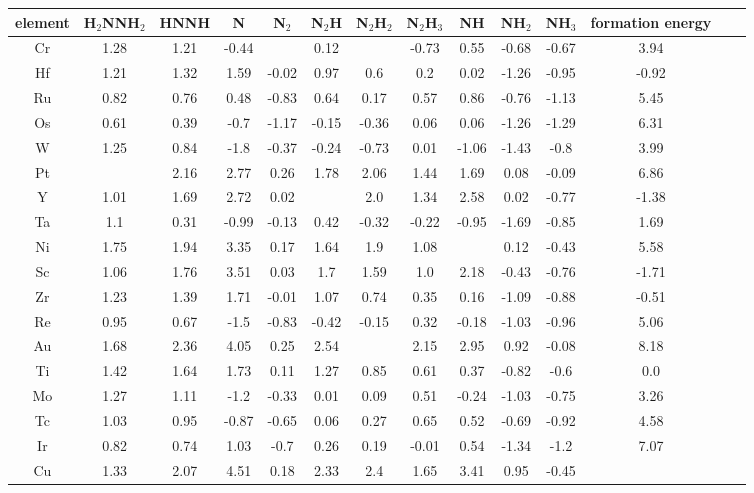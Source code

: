 \begin{center}
\begin{tabular}{| c | c | c | c | c | c | c | c | c | c | c | c | c | c |}
\hline
element & H$_2$NNH$_2$ & HNNH & N & N$_2$ & N$_2$H & N$_2$H$_2$ & N$_2$H$_3$ & NH & NH$_2$ & NH$_3$ & formation energy\\
\hline

Cr & 1.28 & 1.21 & -0.44 &  & 0.12 &  & -0.73 & 0.55 & -0.68 & -0.67 & 3.94 \\
Hf & 1.21 & 1.32 & 1.59 & -0.02 & 0.97 & 0.6 & 0.2 & 0.02 & -1.26 & -0.95 & -0.92 \\
Ru & 0.82 & 0.76 & 0.48 & -0.83 & 0.64 & 0.17 & 0.57 & 0.86 & -0.76 & -1.13 & 5.45 \\
Os & 0.61 & 0.39 & -0.7 & -1.17 & -0.15 & -0.36 & 0.06 & 0.06 & -1.26 & -1.29 & 6.31 \\
W & 1.25 & 0.84 & -1.8 & -0.37 & -0.24 & -0.73 & 0.01 & -1.06 & -1.43 & -0.8 & 3.99 \\
Pt &  & 2.16 & 2.77 & 0.26 & 1.78 & 2.06 & 1.44 & 1.69 & 0.08 & -0.09 & 6.86 \\
Y & 1.01 & 1.69 & 2.72 & 0.02 &  & 2.0 & 1.34 & 2.58 & 0.02 & -0.77 & -1.38 \\
Ta & 1.1 & 0.31 & -0.99 & -0.13 & 0.42 & -0.32 & -0.22 & -0.95 & -1.69 & -0.85 & 1.69 \\
Ni & 1.75 & 1.94 & 3.35 & 0.17 & 1.64 & 1.9 & 1.08 &  & 0.12 & -0.43 & 5.58 \\
Sc & 1.06 & 1.76 & 3.51 & 0.03 & 1.7 & 1.59 & 1.0 & 2.18 & -0.43 & -0.76 & -1.71 \\
Zr & 1.23 & 1.39 & 1.71 & -0.01 & 1.07 & 0.74 & 0.35 & 0.16 & -1.09 & -0.88 & -0.51 \\
Re & 0.95 & 0.67 & -1.5 & -0.83 & -0.42 & -0.15 & 0.32 & -0.18 & -1.03 & -0.96 & 5.06 \\
Au & 1.68 & 2.36 & 4.05 & 0.25 & 2.54 &  & 2.15 & 2.95 & 0.92 & -0.08 & 8.18 \\
Ti & 1.42 & 1.64 & 1.73 & 0.11 & 1.27 & 0.85 & 0.61 & 0.37 & -0.82 & -0.6 & 0.0 \\
Mo & 1.27 & 1.11 & -1.2 & -0.33 & 0.01 & 0.09 & 0.51 & -0.24 & -1.03 & -0.75 & 3.26 \\
Tc & 1.03 & 0.95 & -0.87 & -0.65 & 0.06 & 0.27 & 0.65 & 0.52 & -0.69 & -0.92 & 4.58 \\
Ir & 0.82 & 0.74 & 1.03 & -0.7 & 0.26 & 0.19 & -0.01 & 0.54 & -1.34 & -1.2 & 7.07 \\
Cu & 1.33 & 2.07 & 4.51 & 0.18 & 2.33 & 2.4 & 1.65 & 3.41 & 0.95 & -0.45 &  \\

\end{tabular}
\end{center}
